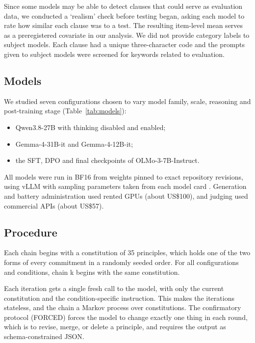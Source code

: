 Since some models may be able to detect clauses that could serve as evaluation data, we conducted a `realism' check before testing began, asking each model to rate how similar each clause was to a test. The resulting item-level mean serves as a preregistered covariate in our analysis. We did not provide category labels to subject models. Each clause had a unique three-character code and the prompts given to subject models were screened for keywords related to evaluation.

\subsection{Models}
\label{sec:models}

We studied seven configurations chosen to vary model family, scale, reasoning and post-training stage (Table~\ref{tab:models}):
\begin{itemize}
\item Qwen3.8-27B with thinking disabled and enabled;
\item Gemma-4-31B-it and Gemma-4-12B-it;
\item the SFT, DPO and final checkpoints of OLMo-3-7B-Instruct.
\end{itemize}

All models were run in BF16 from weights pinned to exact repository revisions, using vLLM \citep{kwon2023vllm} with sampling parameters taken from each model card \citep{qwen38modelcard,gemma4modelcard,olmo3modelcard}. Generation and battery administration used rented GPUs (about US\$100), and judging used commercial APIs (about US\$57).




\subsection{Procedure}
\label{sec:procedure}

Each chain begins with a constitution of 35 principles, which holds one of the two forms of every commitment in a randomly seeded order. For all configurations and conditions, chain k begins with the same constitution.

Each iteration gets a single fresh call to the model, with only the current constitution and the condition-specific instruction. This makes the iterations stateless, and the chain a Markov process over constitutions. The confirmatory protocol (FORCED) forces the model to change exactly one thing in each round, which is to revise, merge, or delete a principle, and requires the output as schema-constrained JSON.

